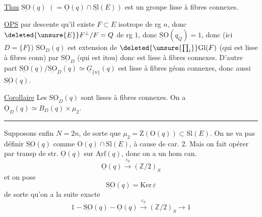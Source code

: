 \uline{Thm}  $\underline{\mathrm{SO}}(q)$ $(=\underline{\mathrm O}(q)\cap\underline{\mathrm{Sl}}(E))$ est un groupe lisse à fibres connexes.

\uline{OPS} par descente qu'il existe $F\subset E$ isotrope de rg $n$, donc $\deleted{\unsure{E}}F^\perp/F=Q$ de rg $1$, donc $\mathrm{SO}(q_Q)=1$, donc  (ici $D=\{F\}$) $\mathrm{SO}_D(q)$ est extension de $\deleted{\unsure{\prod_i}}\mathrm{Gl}(F)$ (qui est lisse à fibres conn) par $\underline{\mathrm{SO}}_D$ (qui est itou)
donc est lisse à fibres connexes. D'autre part $\underline{\mathrm{SO}}(q)/\underline{\mathrm{SO}}_D(q)\simeq\underline G_{\{n\}}(q)$ est lisse à fibres géom connexes, donc aussi $\underline{\mathrm{SO}}(q)$.

\uline{Corollaire} Les $\underline{\mathrm{SO}}_D(q)$  sont lisses à fibres connexes. On a $\underline{\mathrm O}_D(q)\simeq B_D(q)\times\mu_2$.

\begin{center}\rule{.12\linewidth}{.4pt}\end{center}

Supposons enfin $N=2n$, de sorte que $\mu_2=\mathrm Z(\mathrm O(q))\subset\mathrm{Sl}(E)$. On ne va pas définir $\underline{\mathrm{SO}}(q)$ comme $\mathrm O(q)\cap\mathrm{Sl}(E)$, à cause de car. $2$. Mais on fait opérer par transp de str. $\underline{\mathrm O}(q)$ sur $\underline{\mathrm{Arf}}(q)$, donc on a un hom can.
\[
\underline{\mathrm O}(q)\xrightarrow{\varepsilon_q}(\mathbb Z/2)_S
\]
et on pose
\[
\underline{\mathrm{SO}}(q)=\mathrm{Ker}\,\varepsilon
\]
de sorte qu'on a la suite exacte
\[
1\mathbin{-}\underline{\mathrm{SO}}(q)\mathbin{-}\underline{\mathrm O}(q)\xrightarrow{\varepsilon_q}(\mathbb Z/2)_S\longrightarrow1
\]

%

